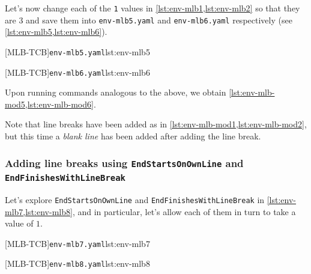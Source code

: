 	Let's%
	  now change each of the \texttt{1} values in \cref{lst:env-mlb1,lst:env-mlb2} so that they are $3$ and
	save them into \texttt{env-mlb5.yaml} and \texttt{env-mlb6.yaml} respectively (see \cref{lst:env-mlb5,lst:env-mlb6}).

	\begin{minipage}{.45\textwidth}
		[MLB-TCB]{\texttt{env-mlb5.yaml}}{lst:env-mlb5}
	\end{minipage}
	\hfill
	\begin{minipage}{.45\textwidth}
		[MLB-TCB]{\texttt{env-mlb6.yaml}}{lst:env-mlb6}
	\end{minipage}

	Upon running  commands analogous to the above, we obtain \cref{lst:env-mlb-mod5,lst:env-mlb-mod6}.

	\begin{widepage}
		\begin{minipage}{.56\linewidth}
		\end{minipage}
		\hfill
		\begin{minipage}{.43\linewidth}
		\end{minipage}
	\end{widepage}

	Note that line breaks have been added as in \cref{lst:env-mlb-mod1,lst:env-mlb-mod2}, but this time a \emph{blank line}
	has been added after adding the line break.

\subsubsection[Adding line breaks: \texttt{EndStartsOnOwnLine} and \texttt{EndFinishesWithLineBreak}]{Adding line breaks using \texttt{EndStartsOnOwnLine} and \texttt{EndFinishesWithLineBreak}}
	Let's explore \texttt{EndStartsOnOwnLine} and \texttt{EndFinishesWithLineBreak} in \cref{lst:env-mlb7,lst:env-mlb8},
	and in particular, let's allow each of them in turn to take a value of $1$.

	\begin{minipage}{.49\textwidth}
		[MLB-TCB]{\texttt{env-mlb7.yaml}}{lst:env-mlb7}
	\end{minipage}
	\hfill
	\begin{minipage}{.49\textwidth}
		[MLB-TCB]{\texttt{env-mlb8.yaml}}{lst:env-mlb8}
	\end{minipage}

